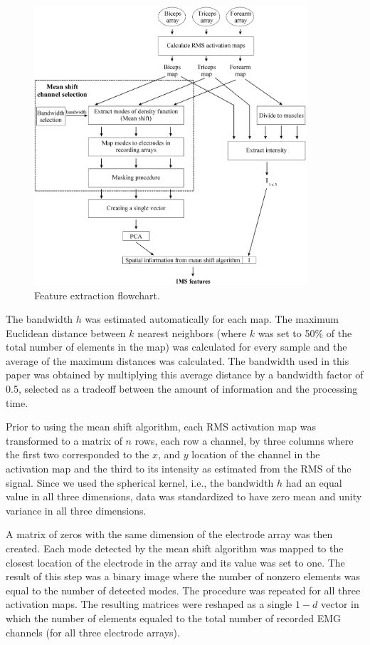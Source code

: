 \begin{figure}[ht]
\centering
\includegraphics[width=0.9\textwidth]{Images/figure3_2.png}
\caption{Feature extraction flowchart.}
\label{fig:3-2}
\end{figure}   

The bandwidth $h$ was estimated automatically for each map. The maximum Euclidean distance between $k$ nearest neighbors (where $k$ was set to 50\% of the total number of elements in the map) was calculated for every sample and the average of the maximum distances was calculated. The bandwidth used in this paper was obtained by multiplying this average distance by a bandwidth factor of 0.5, selected as a tradeoff between the amount of information and the processing time.

Prior to using the mean shift algorithm, each RMS activation map was transformed to a matrix of $n$ rows, each row a channel, by three columns where the first two corresponded to the $x$, and $y$ location of the channel in the activation map and the third to its intensity as estimated from the RMS of the signal. Since we used the spherical kernel, i.e., the bandwidth $h$ had an equal value in all three dimensions, data was standardized to have zero mean and unity variance in all three dimensions.

A matrix of zeros with the same dimension of the electrode array was then created. Each mode detected by the mean shift algorithm was mapped to the closest location of the electrode in the array and its value was set to one. The result of this step was a binary image where the number of nonzero elements was equal to the number of detected modes. The procedure was repeated for all three activation maps. The resulting matrices were reshaped as a single $1-d$ vector in which the number of elements equaled to the total number of recorded EMG channels (for all three electrode arrays).

